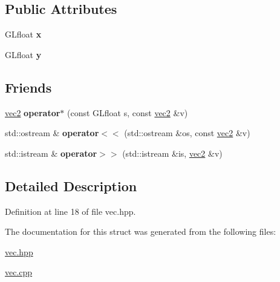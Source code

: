 \subsection*{Public Attributes}
\begin{DoxyCompactItemize}
\item 
\hypertarget{struct_angel_1_1vec2_ab99b91871c08bbf76bf4a5e554ccac8f}{G\-Lfloat {\bfseries x}}\label{struct_angel_1_1vec2_ab99b91871c08bbf76bf4a5e554ccac8f}

\item 
\hypertarget{struct_angel_1_1vec2_a9f0e4c33e7884eca47d771ccfd4ea0bd}{G\-Lfloat {\bfseries y}}\label{struct_angel_1_1vec2_a9f0e4c33e7884eca47d771ccfd4ea0bd}

\end{DoxyCompactItemize}
\subsection*{Friends}
\begin{DoxyCompactItemize}
\item 
\hypertarget{struct_angel_1_1vec2_a1f371c4b26f86deb4d296dfff8ff1fc1}{\hyperlink{struct_angel_1_1vec2}{vec2} {\bfseries operator$\ast$} (const G\-Lfloat s, const \hyperlink{struct_angel_1_1vec2}{vec2} \&v)}\label{struct_angel_1_1vec2_a1f371c4b26f86deb4d296dfff8ff1fc1}

\item 
\hypertarget{struct_angel_1_1vec2_a5533e582fe94db90861caa394494f2cf}{std\-::ostream \& {\bfseries operator$<$$<$} (std\-::ostream \&os, const \hyperlink{struct_angel_1_1vec2}{vec2} \&v)}\label{struct_angel_1_1vec2_a5533e582fe94db90861caa394494f2cf}

\item 
\hypertarget{struct_angel_1_1vec2_af8cf130207f2cf5866ac13049e956c75}{std\-::istream \& {\bfseries operator$>$$>$} (std\-::istream \&is, \hyperlink{struct_angel_1_1vec2}{vec2} \&v)}\label{struct_angel_1_1vec2_af8cf130207f2cf5866ac13049e956c75}

\end{DoxyCompactItemize}


\subsection{Detailed Description}


Definition at line 18 of file vec.\-hpp.



The documentation for this struct was generated from the following files\-:\begin{DoxyCompactItemize}
\item 
\hyperlink{vec_8hpp}{vec.\-hpp}\item 
\hyperlink{vec_8cpp}{vec.\-cpp}\end{DoxyCompactItemize}
